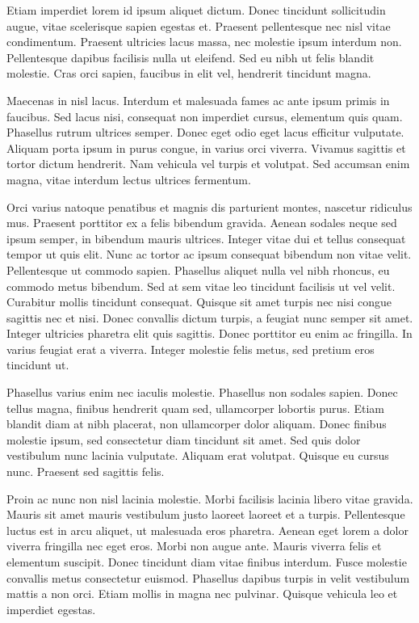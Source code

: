 \documentclass[a4paper,10pt,twoside]{article} %
\begin{document}
Etiam imperdiet lorem id ipsum aliquet dictum.
Donec tincidunt sollicitudin augue, vitae scelerisque sapien egestas et.
Praesent pellentesque nec nisl vitae condimentum.
Praesent ultricies lacus massa, nec molestie ipsum interdum non.
Pellentesque dapibus facilisis nulla ut eleifend.
Sed eu nibh ut felis blandit molestie.
Cras orci sapien, faucibus in elit vel, hendrerit tincidunt magna.

Maecenas in nisl lacus.
Interdum et malesuada fames ac ante ipsum primis in faucibus.
Sed lacus nisi, consequat non imperdiet cursus, elementum quis quam.
Phasellus rutrum ultrices semper.
Donec eget odio eget lacus efficitur vulputate.
Aliquam porta ipsum in purus congue, in varius orci viverra.
Vivamus sagittis et tortor dictum hendrerit.
Nam vehicula vel turpis et volutpat.
Sed accumsan enim magna, vitae interdum lectus ultrices fermentum.

Orci varius natoque penatibus et magnis dis parturient montes, nascetur ridiculus mus.
Praesent porttitor ex a felis bibendum gravida.
Aenean sodales neque sed ipsum semper, in bibendum mauris ultrices.
Integer vitae dui et tellus consequat tempor ut quis elit.
Nunc ac tortor ac ipsum consequat bibendum non vitae velit.
Pellentesque ut commodo sapien.
Phasellus aliquet nulla vel nibh rhoncus, eu commodo metus bibendum.
Sed at sem vitae leo tincidunt facilisis ut vel velit.
Curabitur mollis tincidunt consequat.
Quisque sit amet turpis nec nisi congue sagittis nec et nisi.
Donec convallis dictum turpis, a feugiat nunc semper sit amet.
Integer ultricies pharetra elit quis sagittis.
Donec porttitor eu enim ac fringilla.
In varius feugiat erat a viverra.
Integer molestie felis metus, sed pretium eros tincidunt ut.

Phasellus varius enim nec iaculis molestie.
Phasellus non sodales sapien.
Donec tellus magna, finibus hendrerit quam sed, ullamcorper lobortis purus.
Etiam blandit diam at nibh placerat, non ullamcorper dolor aliquam.
Donec finibus molestie ipsum, sed consectetur diam tincidunt sit amet.
Sed quis dolor vestibulum nunc lacinia vulputate.
Aliquam erat volutpat.
Quisque eu cursus nunc.
Praesent sed sagittis felis.

Proin ac nunc non nisl lacinia molestie.
Morbi facilisis lacinia libero vitae gravida.
Mauris sit amet mauris vestibulum justo laoreet laoreet et a turpis.
Pellentesque luctus est in arcu aliquet, ut malesuada eros pharetra.
Aenean eget lorem a dolor viverra fringilla nec eget eros.
Morbi non augue ante.
Mauris viverra felis et elementum suscipit.
Donec tincidunt diam vitae finibus interdum.
Fusce molestie convallis metus consectetur euismod.
Phasellus dapibus turpis in velit vestibulum mattis a non orci.
Etiam mollis in magna nec pulvinar.
Quisque vehicula leo et imperdiet egestas.
\end{document}
